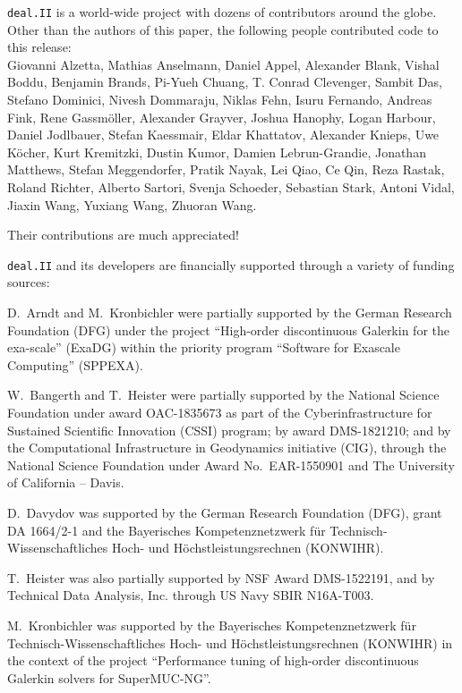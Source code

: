 \documentclass{ansarticle-preprint}
\newcommand{\specialword}[1]{\texttt{#1}}
\newcommand{\dealii}{{\specialword{deal.II}}\xspace}
\begin{document}
\dealii is a world-wide project with dozens of contributors around the
globe. Other than the authors of this paper, the following people
contributed code to this release:\\
  Giovanni Alzetta,
  Mathias Anselmann,
  Daniel Appel,
  Alexander Blank,
  Vishal Boddu,
  Benjamin Brands,
  Pi-Yueh Chuang,
  T. Conrad Clevenger,
  Sambit Das,
  Stefano Dominici,
  Nivesh Dommaraju,
  Niklas Fehn,
  Isuru Fernando,
  Andreas Fink,
  Rene Gassm{\"o}ller,
  Alexander Grayver,
  Joshua Hanophy,
  Logan Harbour,
  Daniel Jodlbauer,
  Stefan Kaessmair,
  Eldar Khattatov,
  Alexander Knieps,
  Uwe K{\"o}cher,
  Kurt Kremitzki,
  Dustin Kumor,
  Damien Lebrun-Grandie,
  Jonathan Matthews,
  Stefan Meggendorfer,
  Pratik Nayak,
  Lei Qiao,
  Ce Qin,
  Reza Rastak,
  Roland Richter,
  Alberto Sartori,
  Svenja Schoeder,
  Sebastian Stark,
  Antoni Vidal,
  Jiaxin Wang,
  Yuxiang Wang,
  Zhuoran Wang.

Their contributions are much appreciated!


\bigskip

\dealii and its developers are financially supported through a
variety of funding sources:

D.~Arndt and M.~Kronbichler were partially supported by the German
Research Foundation (DFG) under the project ``High-order discontinuous
Galerkin for the exa-scale'' (\mbox{ExaDG}) within the priority program ``Software
for Exascale Computing'' (SPPEXA).

W.~Bangerth and T.~Heister were partially
supported by the National Science Foundation under award OAC-1835673
as part of the Cyberinfrastructure for Sustained Scientific Innovation (CSSI)
program; by award DMS-1821210; and by the Computational Infrastructure
in Geodynamics initiative (CIG), through the National Science
Foundation under Award No.~EAR-1550901 and The
University of California -- Davis.

D.~Davydov was supported by the German Research Foundation (DFG), grant DA
1664/2-1 and the Bayerisches Kompetenznetzwerk
f\"ur Technisch-Wissenschaftliches Hoch- und H\"ochstleistungsrechnen
(KONWIHR).

T.~Heister was also partially supported by NSF Award DMS-1522191, and
by Technical Data Analysis, Inc. through US Navy SBIR N16A-T003.

M.~Kronbichler was supported by the Bayerisches Kompetenznetzwerk
f\"ur Technisch-Wissen\-schaft\-li\-ches Hoch- und H\"ochstleistungsrechnen
(KONWIHR) in the context of the project
``Performance tuning of high-order discontinuous Galerkin solvers for
SuperMUC-NG''.
\end{document}
